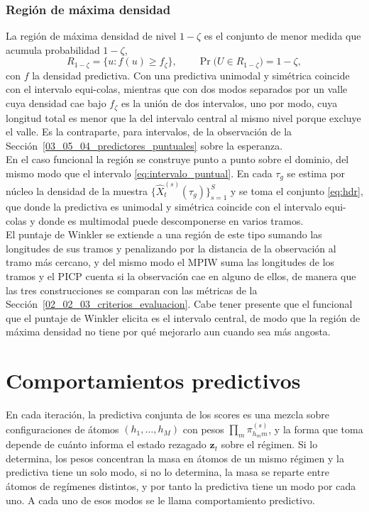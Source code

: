 \subsubsection{Región de máxima densidad}
\label{03_05_05_03_hdr}

La región de máxima densidad de nivel $1-\zeta$ \citep{03_05_hyndman1996hdr} es el conjunto de menor medida que acumula probabilidad $1-\zeta$,
\begin{equation}\label{eq:hdr}
    R_{1-\zeta} = \bigl\{u : f(u) \geq f_{\zeta}\bigr\},
    \qquad
    \Pr\bigl(U \in R_{1-\zeta}\bigr) = 1-\zeta,
\end{equation}
con $f$ la densidad predictiva. Con una predictiva unimodal y simétrica coincide con el intervalo equi-colas, mientras que con dos modos separados por un valle cuya densidad cae bajo $f_\zeta$ es la unión de dos intervalos, uno por modo, cuya longitud total es menor que la del intervalo central al mismo nivel porque excluye el valle. Es la contraparte, para intervalos, de la observación de la Sección~\ref{03_05_04_predictores_puntuales} sobre la esperanza.\\

En el caso funcional la región se construye punto a punto sobre el dominio, del mismo modo que el intervalo \eqref{eq:intervalo_puntual}. En cada $\tau_g$ se estima por núcleo la densidad de la muestra $\{\widehat{X}_t^{(s)}(\tau_g)\}_{s=1}^{S}$ y se toma el conjunto \eqref{eq:hdr}, que donde la predictiva es unimodal y simétrica coincide con el intervalo equi-colas y donde es multimodal puede descomponerse en varios tramos.\\

El puntaje de Winkler se extiende a una región de este tipo sumando las longitudes de sus tramos y penalizando por la distancia de la observación al tramo más cercano, y del mismo modo el MPIW suma las longitudes de los tramos y el PICP cuenta si la observación cae en alguno de ellos, de manera que las tres construcciones se comparan con las métricas de la Sección~\ref{02_02_03_criterios_evaluacion}. Cabe tener presente que el funcional que el puntaje de Winkler elicita es el intervalo central, de modo que la región de máxima densidad no tiene por qué mejorarlo aun cuando sea más angosta.

\section{Comportamientos predictivos}
\label{03_06_00_comportamientos}
En cada iteración, la predictiva conjunta de los scores es una mezcla sobre configuraciones de átomos $(h_1, \dots, h_M)$ con pesos $\prod_m \pi_{h_m m}^{(s)}$, y la forma que toma depende de cuánto informa el estado rezagado $\mathbf{z}_t$ sobre el régimen. Si lo determina, los pesos concentran la masa en átomos de un mismo régimen y la predictiva tiene un solo modo, si no lo determina, la masa se reparte entre átomos de regímenes distintos, y por tanto la predictiva tiene un modo por cada uno. A cada uno de esos modos se le llama comportamiento predictivo.\\

